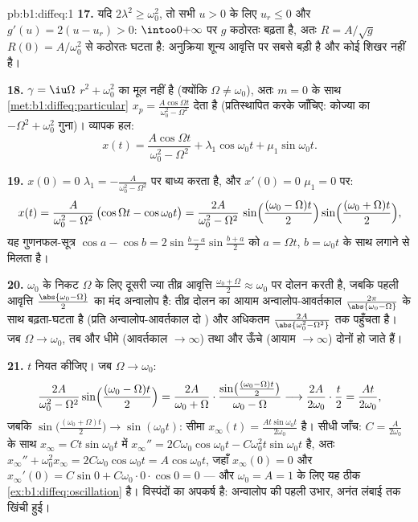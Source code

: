 \begin{solution}{pb:b1:diffeq:1}
\textbf{17.} यदि $2\lambda^2 \geq \omega_0^2$, तो सभी $u > 0$ के लिए $u_r
\leq 0$ और $g'(u) = 2(u - u_r) > 0$: $\intoo0{+\infty}$ पर $g$ कठोरतः बढ़ता
है, अतः $R = A/\sqrt g$ $R(0) = A/\omega_0^2$ से कठोरतः घटता है: अनुक्रिया
शून्य आवृत्ति पर सबसे बड़ी है और कोई शिखर नहीं है।

\textbf{18.} $\gamma = \iu\Omega$ $r^2 + \omega_0^2$ का मूल नहीं है (क्योंकि
$\Omega \neq \omega_0$), अतः $m = 0$ के साथ \cref{met:b1:diffeq:particular}
$x_p = \frac{A\cos\Omega t}{\omega_0^2 - \Omega^2}$ देता है (प्रतिस्थापित
करके जाँचिए: कोज्या का $-\Omega^2 + \omega_0^2$ गुना)। व्यापक हल:
\[
x(t) = \frac{A\cos\Omega t}{\omega_0^2 - \Omega^2}
+ \lambda_1\cos\omega_0 t + \mu_1\sin\omega_0 t .
\]

\textbf{19.} $x(0) = 0$ $\lambda_1 = -\frac A{\omega_0^2 - \Omega^2}$ पर
बाध्य करता है, और $x'(0) = 0$ $\mu_1 = 0$ पर:
\[
x(t) = \frac{A}{\omega_0^2 - \Omega^2}\,
\bigl(\cos\Omega t - \cos\omega_0 t\bigr)
= \frac{2A}{\omega_0^2 - \Omega^2}\,
\sin\Bigl(\frac{(\omega_0 - \Omega)t}2\Bigr)
\sin\Bigl(\frac{(\omega_0 + \Omega)t}2\Bigr) ,
\]
यह गुणनफल-सूत्र $\cos a - \cos b = 2\sin\frac{b - a}2\sin\frac{b + a}2$ को
$a = \Omega t$, $b = \omega_0 t$ के साथ लगाने से मिलता है।

\textbf{20.} $\omega_0$ के निकट $\Omega$ के लिए दूसरी ज्या तीव्र आवृत्ति
$\frac{\omega_0 + \Omega}2 \approx \omega_0$ पर दोलन करती है, जबकि पहली
आवृत्ति $\frac{\abs{\omega_0 - \Omega}}2$ का मंद अन्वालोप है: तीव्र दोलन का
आयाम अन्वालोप-आवर्तकाल $\frac{2\pi}{\abs{\omega_0 - \Omega}}$ के साथ
बढ़ता-घटता है (प्रति अन्वालोप-आवर्तकाल दो ) और अधिकतम
$\frac{2A}{\abs{\omega_0^2 - \Omega^2}}$ तक पहुँचता है। जब $\Omega \to
\omega_0$, तब  और धीमे (आवर्तकाल $\to \infty$) तथा और ऊँचे (आयाम $\to
\infty$) दोनों हो जाते हैं।

\textbf{21.} $t$ नियत कीजिए। जब $\Omega \to \omega_0$:
\[
\frac{2A}{\omega_0^2 - \Omega^2}\sin\Bigl(\frac{(\omega_0 -
\Omega)t}2\Bigr)
= \frac{2A}{\omega_0 + \Omega}\cdot
\frac{\sin\bigl(\frac{(\omega_0 - \Omega)t}2\bigr)}
{\omega_0 - \Omega}
\longrightarrow \frac{2A}{2\omega_0}\cdot\frac t2
= \frac{At}{2\omega_0} ,
\]
जबकि $\sin\bigl(\frac{(\omega_0 + \Omega)t}2\bigr) \to \sin(\omega_0 t)$:
सीमा $x_\infty(t) = \frac{At\sin\omega_0 t}{2\omega_0}$ है। सीधी जाँच: $C =
\frac A{2\omega_0}$ के साथ $x_\infty = Ct\sin\omega_0 t$ में $x_\infty'' =
2C\omega_0\cos\omega_0 t - C\omega_0^2 t \sin\omega_0 t$ है, अतः $x_\infty''
+ \omega_0^2 x_\infty = 2C\omega_0\cos\omega_0 t = A\cos\omega_0 t$, जहाँ
$x_\infty(0) = 0$ और $x_\infty'(0) = C\sin 0 + C\omega_0 \cdot 0 \cdot \cos
0 = 0$ --- और $\omega_0 = A = 1$ के लिए यह ठीक
\cref{ex:b1:diffeq:oscillation} है।  विस्पंदों का अपकर्ष है: अन्वालोप
की पहली उभार, अनंत लंबाई तक खिंची हुई।


\end{solution}
